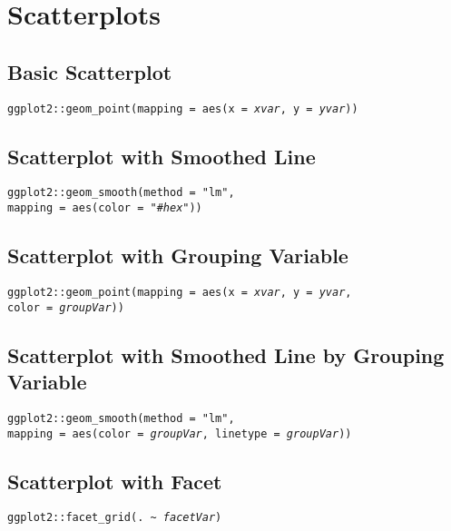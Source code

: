 \documentclass{tufte-handout}
\newenvironment{subs}
  {\adjustwidth{3em}{0pt}}
  {\endadjustwidth}
\begin{document}
\section{Scatterplots}
\begin{subs}
\subsection{Basic Scatterplot}
\noindent \texttt{ggplot2::}{\color{red}\texttt{geom\_point}}\texttt{(mapping = aes(x = \textit{xvar}, y = \textit{yvar}))}

\vspace{3mm}
\subsection{Scatterplot with Smoothed Line}
\noindent \texttt{ggplot2::}{\color{red}\texttt{geom\_smooth}}\texttt{(method = "lm", \\mapping = aes(color = "\#\textit{hex}"))}

\vspace{3mm}
\subsection{Scatterplot with Grouping Variable}
\noindent \texttt{ggplot2::}{\color{red}\texttt{geom\_point}}\texttt{(mapping = aes(x = \textit{xvar}, y = \textit{yvar}, \\ color = \textit{groupVar}))}

\vspace{3mm}
\subsection{Scatterplot with Smoothed Line by Grouping Variable}
\noindent \texttt{ggplot2::}{\color{red}\texttt{geom\_smooth}}\texttt{(method = "lm", \\mapping = aes(color = \textit{groupVar}, linetype = \textit{groupVar}))}

\vspace{3mm}
\subsection{Scatterplot with Facet}
\noindent \texttt{ggplot2::}{\color{red}\texttt{facet\_grid}}\texttt{(. \textasciitilde\ \textit{facetVar})}

\vspace{3mm}

\end{subs}
\end{document}
